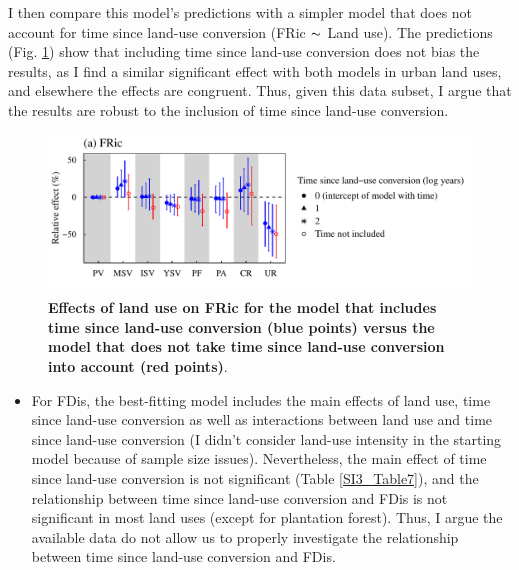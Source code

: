 I then compare this model’s predictions with a simpler model that does not account for time since land-use conversion (FRic  $\thicksim$ Land use). The predictions (Fig. \ref{SI3_F25}) show that including time since land-use conversion does not bias the results, as I find a similar significant effect with both models in urban land uses, and elsewhere the effects are congruent. Thus, given this data subset, I argue that the results are robust to the inclusion of time since land-use conversion.

\begin{figure}[h!]
\centering
\includegraphics[scale=0.7]{Supporting/Chapter3/Figures/SI_time_since_conv_FRic}
\caption[Effects of land use on FRic for the model that includes time since land-use conversion (blue points) versus the model that does not take time since land-use conversion into account (red points)]{\textbf{Effects of land use on FRic for the model that includes time since land-use conversion (blue points) versus the model that does not take time since land-use conversion into account (red points)}.}
\label{SI3_F25}
\end{figure}

\begin{itemize}
\item For FDis, the best-fitting model includes the main effects of land use, time since land-use conversion as well as interactions between land use and time since land-use conversion (I didn't consider land-use intensity in the starting model because of sample size issues). Nevertheless, the main effect of time since land-use conversion is not significant (Table \ref{SI3_Table7}), and the relationship between time since land-use conversion and FDis is not significant in most land uses (except for plantation forest). Thus, I argue the available data do not allow us to properly investigate the relationship between time since land-use conversion and FDis.
\end{itemize}

